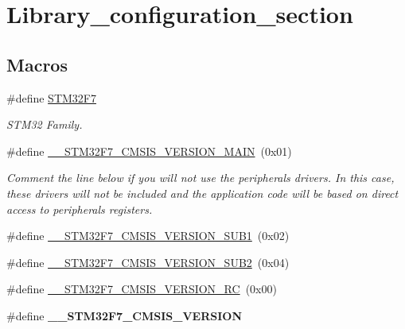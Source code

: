 \hypertarget{group___library__configuration__section}{}\section{Library\+\_\+configuration\+\_\+section}
\label{group___library__configuration__section}
\subsection*{Macros}
\begin{DoxyCompactItemize}
\item 
\mbox{\label{group___library__configuration__section_ga2e06b94c41403a1ec7b8f216daa56254}} 
\#define \mbox{\hyperlink{group___library__configuration__section_ga2e06b94c41403a1ec7b8f216daa56254}{S\+T\+M32\+F7}}
\begin{DoxyCompactList}\small\item\em S\+T\+M32 Family. \end{DoxyCompactList}\item 
\#define \mbox{\hyperlink{group___library__configuration__section_ga3d15a2e4a28240479705b3d11701973f}{\+\_\+\+\_\+\+S\+T\+M32\+F7\+\_\+\+C\+M\+S\+I\+S\+\_\+\+V\+E\+R\+S\+I\+O\+N\+\_\+\+M\+A\+IN}}~(0x01)
\begin{DoxyCompactList}\small\item\em Comment the line below if you will not use the peripherals drivers. In this case, these drivers will not be included and the application code will be based on direct access to peripherals registers. \end{DoxyCompactList}\item 
\#define \mbox{\hyperlink{group___library__configuration__section_ga6798680eacd3d6e366db28c0d0ab3b46}{\+\_\+\+\_\+\+S\+T\+M32\+F7\+\_\+\+C\+M\+S\+I\+S\+\_\+\+V\+E\+R\+S\+I\+O\+N\+\_\+\+S\+U\+B1}}~(0x02)
\item 
\#define \mbox{\hyperlink{group___library__configuration__section_ga5ac10c6c999946353fc277b8eb591a6e}{\+\_\+\+\_\+\+S\+T\+M32\+F7\+\_\+\+C\+M\+S\+I\+S\+\_\+\+V\+E\+R\+S\+I\+O\+N\+\_\+\+S\+U\+B2}}~(0x04)
\item 
\#define \mbox{\hyperlink{group___library__configuration__section_ga53b0c20cdf16509fed10dbb94c53625a}{\+\_\+\+\_\+\+S\+T\+M32\+F7\+\_\+\+C\+M\+S\+I\+S\+\_\+\+V\+E\+R\+S\+I\+O\+N\+\_\+\+RC}}~(0x00)
\item 
\#define {\bfseries \+\_\+\+\_\+\+S\+T\+M32\+F7\+\_\+\+C\+M\+S\+I\+S\+\_\+\+V\+E\+R\+S\+I\+ON}
\end{DoxyCompactItemize}


